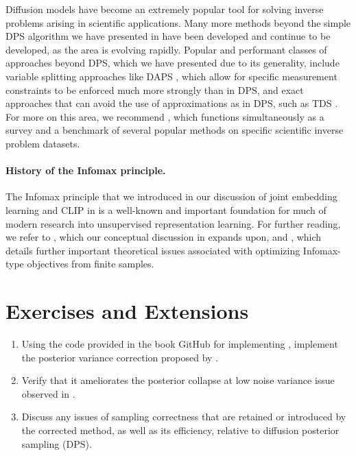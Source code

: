 \documentclass[../../book-main_zh.tex]{subfiles}
\begin{document}
Diffusion models have become an extremely popular tool for solving inverse
problems arising in scientific applications. Many more methods beyond the simple
DPS algorithm we have presented in
 have been
developed and continue to be developed, as the area is evolving rapidly.
Popular and performant classes of approaches beyond DPS, which we have presented
due to its generality, include variable splitting approaches like DAPS
\cite{Zhang2024-ha},
which allow for specific measurement constraints to be enforced much more
strongly than in DPS, and exact approaches that can avoid the use of
approximations as in DPS, such as TDS \cite{wu2023practical}.
For more on this area, we recommend \cite{zheng2025inversebench}, which
functions simultaneously as a survey and a benchmark of several popular methods
on specific scientific inverse problem datasets.


\paragraph{History of the Infomax principle.}
The Infomax principle \cite{infomax} that we introduced in our discussion of
joint embedding learning and CLIP in  is a well-known and
important foundation for much of modern research into unsupervised
representation learning. For further reading, we refer to 
\cite{Van_den_Oord2018-qf}, which our conceptual discussion in  expands upon, 
and \cite{Oko2025-wk}, which details further important theoretical issues associated with
optimizing Infomax-type objectives from finite samples.

\section{Exercises and Extensions}

\begin{exercise}

    \begin{enumerate}
        \item Using the code provided in the book GitHub for implementing
            ,
            implement the
            posterior variance correction proposed by
            \textcite{rozet2024learning}.
        \item Verify that it ameliorates the posterior collapse at low noise
            variance issue observed in
            .
        \item Discuss any issues of sampling correctness that are retained or
            introduced by the corrected method, as well as its
            efficiency, relative to
            diffusion posterior sampling (DPS).
    \end{enumerate}

\end{exercise}
\end{document}
